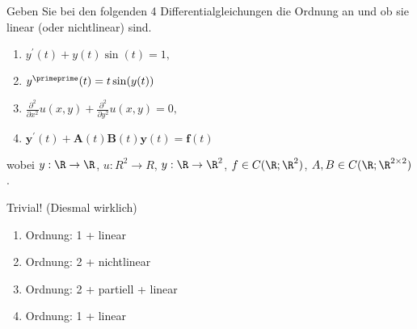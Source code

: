 \begin{exercise}

Geben Sie bei den folgenden 4 Differentialgleichungen die Ordnung an und ob sie linear (oder nichtlinear)
sind.

\begin{enumerate}[label = \textbf{\alph*)}]
  \item $y^\prime(t) + y(t) \sin(t)  = 1,$
  \item $y^\primeprime(t)  = t \sin(y(t))$
  \item $\frac{\partial^2}{\partial x^2} u(x, y) + \frac{\partial^2}{\partial y^2} u(x, y)  = 0,$
  \item $\mathbf{y}^\prime(t) + \mathbf{A}(t) \mathbf{B}(t) \mathbf{y}(t)  = \mathbf{f}(t)$
\end{enumerate}

wobei $y: \R \to \R$, $u: R^2 \to R$, $y: \R \to \R^2$, $f \in C(\R; \R^2)$, $A, B \in C(\R; \R^{2 \times 2})$.

\end{exercise}

\begin{solution}

Trivial! (Diesmal wirklich)

\begin{enumerate}[label = \textbf{\alph*)}]
  \item Ordnung: 1 + linear
  \item Ordnung: 2 + nichtlinear
  \item Ordnung: 2 + partiell + linear
  \item Ordnung: 1 + linear
\end{enumerate}

\end{solution}
